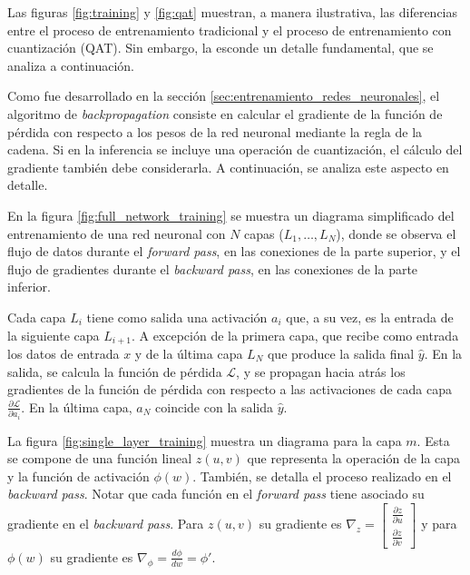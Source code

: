 
Las figuras \ref{fig:training} y \ref{fig:qat} muestran, a manera ilustrativa, las diferencias entre el proceso de entrenamiento tradicional y el proceso de entrenamiento con cuantización (QAT). Sin embargo, la  esconde un detalle fundamental, que se analiza a continuación.

Como fue desarrollado en la sección \ref{sec:entrenamiento_redes_neuronales}, el algoritmo de \textit{backpropagation} consiste en calcular el gradiente de la función de pérdida con respecto a los pesos de la red neuronal mediante la regla de la cadena. Si en la inferencia se incluye una operación de cuantización, el cálculo del gradiente también debe considerarla. A continuación, se analiza este aspecto en detalle.

En la figura \ref{fig:full_network_training} se muestra un diagrama simplificado del entrenamiento de una red neuronal con $N$ capas ($L_1, \ldots, L_N$), donde se observa el flujo de datos durante el \textit{forward pass}, en las conexiones de la parte superior, y el flujo de gradientes durante el \textit{backward pass}, en las conexiones de la parte inferior.


Cada capa $L_{i}$ tiene como salida una activación $a_{i}$ que, a su vez, es la entrada de la siguiente capa $L_{i+1}$. A excepción de la primera capa, que recibe como entrada los datos de entrada $x$ y de la última capa $L_{N}$ que produce la salida final $\hat{y}$. En la salida, se calcula la función de pérdida $\mathcal{L}$, y se propagan hacia atrás los gradientes de la función de pérdida con respecto a las activaciones de cada capa $\frac{\partial \mathcal{L}}{\partial a_{i}}$. En la última capa, $a_{N}$ coincide con la salida $\hat{y}$.

La figura \ref{fig:single_layer_training} muestra un diagrama para la capa $m$. Esta se compone de una función lineal $z(u, v)$ que representa la operación de la capa y la función de activación $\phi(w)$. También, se detalla el proceso realizado en el \textit{backward pass}. Notar que cada función en el \textit{forward pass} tiene asociado su gradiente en el \textit{backward pass}. Para $z(u, v)$ su gradiente es $\nabla_z = \begin{bmatrix}\frac{\partial z}{\partial u}\\ \frac{\partial z}{\partial v}\end{bmatrix}$ y para $\phi(w)$ su gradiente es $\nabla_\phi = \frac{d\phi}{dw} = \phi'$.

